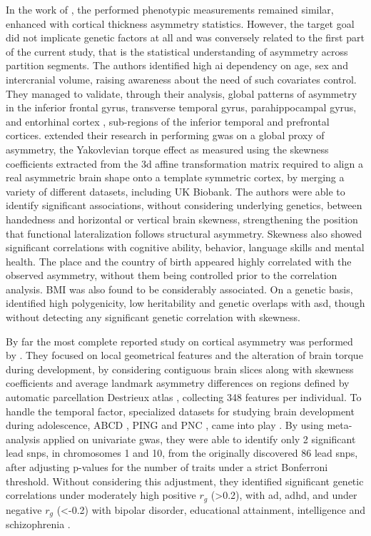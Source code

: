 In the work of \citet{Kong2018}, the performed phenotypic measurements remained similar, enhanced with cortical thickness asymmetry statistics. However, the target goal did not implicate genetic factors at all and was conversely related to the first part of the current study, that is the statistical understanding of asymmetry across partition segments. The authors identified high \ac{ai} dependency on age, sex and intercranial volume, raising awareness about the need of such covariates control. They managed to validate, through their analysis, global patterns of asymmetry in the inferior frontal gyrus, transverse temporal gyrus, parahippocampal gyrus, and entorhinal cortex \cite{Kong2018}, sub-regions of the inferior temporal and prefrontal cortices. \citet{Kong2021} extended their research in performing \ac{gwas} on a global proxy of asymmetry, the Yakovlevian torque effect as measured using the skewness coefficients extracted from the \ac{3d} affine transformation matrix required to align a real asymmetric brain shape onto a template symmetric cortex, by merging a variety of different datasets, including UK Biobank. The authors were able to identify significant associations, without considering underlying genetics, between handedness and horizontal or vertical brain skewness, strengthening the position that functional lateralization follows structural asymmetry. Skewness also showed significant correlations with cognitive ability, behavior, language skills and mental health. The place and the country of birth appeared highly correlated with the observed asymmetry, without them being controlled prior to the correlation analysis. BMI was also found to be considerably associated. On a genetic basis, \citet{Kong2021} identified high polygenicity, low heritability and genetic overlaps with \ac{asd}, though without detecting any significant genetic correlation with skewness. 

By far the most complete reported study on cortical asymmetry was performed  by \citet{Zhao2022}. They focused on local geometrical features and the alteration of brain torque during development, by considering contiguous brain slices along with skewness coefficients and average landmark asymmetry differences on regions defined by automatic parcellation Destrieux atlas \cite{Destrieux2010}, collecting 348 features per individual. To handle the temporal factor, specialized datasets for studying brain development during adolescence, ABCD \cite{Volkow2018}, PING \cite{Jernigan2016} and PNC \cite{Satterthwaite2016}, came into play \cite{Zhao2022}. By using meta-analysis applied on univariate \ac{gwas}, they were able to identify only 2 significant lead \acp{snp}, in chromosomes 1 and 10,  from the originally discovered 86 lead \acp{snp}, after adjusting p-values for the number of traits under a strict Bonferroni threshold. Without considering this adjustment, they identified significant genetic correlations under  moderately high positive $r_g$ (>0.2), with \ac{ad}, \ac{adhd}, and under negative $r_g$ (<-0.2) with bipolar disorder, educational attainment, intelligence and schizophrenia \cite{Zhao2022}. 

